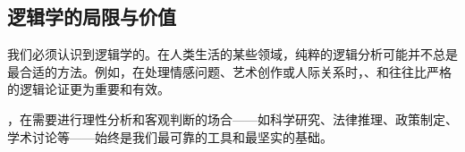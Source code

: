 \subsection{逻辑学的局限与价值}

我们必须认识到逻辑学的。在人类生活的某些领域，纯粹的逻辑分析可能并不总是最合适的方法。例如，在处理情感问题、艺术创作或人际关系时，、和往往比严格的逻辑论证更为重要和有效。

，在需要进行理性分析和客观判断的场合——如科学研究、法律推理、政策制定、学术讨论等——始终是我们最可靠的工具和最坚实的基础。

